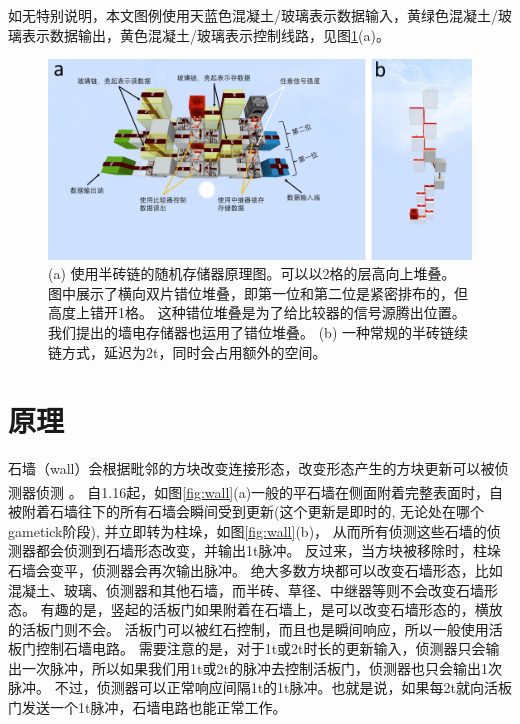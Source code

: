 \documentclass[UTF8,12pt,punct=kaiming,fontset=none]{article}
\newcommand*{\upcite}[1]{
    \textsuperscript{\cite{#1}}
}
\begin{document}
如无特别说明，本文图例使用天蓝色混凝土/玻璃表示数据输入，黄绿色混凝土/玻璃表示数据输出，黄色混凝土/玻璃表示控制线路，见图\ref{fig:normalRAM}(a)。
\begin{figure}[t]
    \centering
    \includegraphics[width=.8\textwidth]{Fig1.pdf}
    \caption{\small (a) 使用半砖链的随机存储器原理图。可以以2格的层高向上堆叠。
    图中展示了横向双片错位堆叠，即第一位和第二位是紧密排布的，但高度上错开1格。
    这种错位堆叠是为了给比较器的信号源腾出位置。我们提出的墙电存储器也运用了错位堆叠。
    (b) 一种常规的半砖链续链方式，延迟为2t，同时会占用额外的空间。}
    \label{fig:normalRAM}
\end{figure}

\section{原理}
石墙（wall）会根据毗邻的方块改变连接形态，改变形态产生的方块更新可以被侦测器侦测\upcite{Wall}。
自1.16起，如图\ref{fig:wall}(a)一般的平石墙在侧面附着完整表面时，自被附着石墙往下的所有石墙会瞬间受到更新(这个更新是即时的, 无论处在哪个gametick阶段), 并立即转为柱垛，如图\ref{fig:wall}(b)，
从而所有侦测这些石墙的侦测器都会侦测到石墙形态改变，并输出1t脉冲。
反过来，当方块被移除时，柱垛石墙会变平，侦测器会再次输出脉冲。
绝大多数方块都可以改变石墙形态，比如混凝土、玻璃、侦测器和其他石墙，而半砖、草径、中继器等则不会改变石墙形态。
有趣的是，竖起的活板门如果附着在石墙上，是可以改变石墙形态的，横放的活板门则不会。
活板门可以被红石控制，而且也是瞬间响应，所以一般使用活板门控制石墙电路。
需要注意的是，对于1t或2t时长的更新输入，侦测器只会输出一次脉冲，所以如果我们用1t或2t的脉冲去控制活板门，侦测器也只会输出1次脉冲。
不过，侦测器可以正常响应间隔1t的1t脉冲。也就是说，如果每2t就向活板门发送一个1t脉冲，石墙电路也能正常工作。
\end{document}
